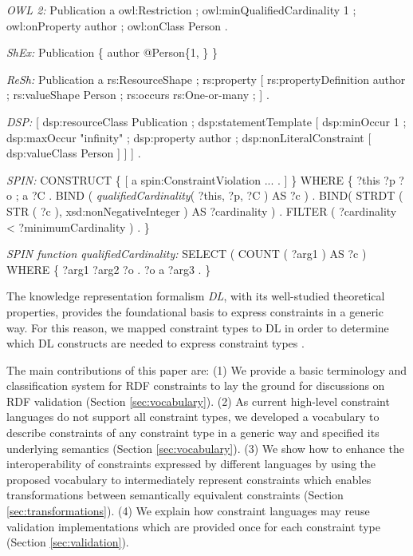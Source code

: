 \documentclass[a4paper,fontsize=11pt]{scrartcl}
\begin{document}
\begin{ex}[commandchars=\\\{\}]
\textit{OWL 2:} Publication a owl:Restriction ;
          owl:minQualifiedCardinality 1 ;
          owl:onProperty author ;
          owl:onClass Person .
		
\textit{ShEx:} Publication \{ author @Person\{1, \} \}

\textit{ReSh:} Publication a rs:ResourceShape ; rs:property [
          rs:propertyDefinition author ;
          rs:valueShape Person ;
          rs:occurs rs:One-or-many ; ] .
		
\textit{DSP:} [ dsp:resourceClass Publication ; dsp:statementTemplate [ 
          dsp:minOccur 1 ; dsp:maxOccur "infinity" ; 
          dsp:property author ; 
          dsp:nonLiteralConstraint [ dsp:valueClass Person ] ] ] .
					
\textit{SPIN:} CONSTRUCT \{ [ a spin:ConstraintViolation ... . ] \} WHERE \{ 
          ?this ?p ?o ; a ?C .
          BIND ( \textit{qualifiedCardinality}( ?this, ?p, ?C ) AS ?c ) .
          BIND( STRDT ( STR ( ?c ), xsd:nonNegativeInteger ) AS ?cardinality ) .
          FILTER ( ?cardinality < ?minimumCardinality ) . \}
						
\textit{SPIN function qualifiedCardinality:}										
SELECT ( COUNT ( ?arg1 ) AS ?c ) WHERE \{ ?arg1 ?arg2 ?o . ?o a ?arg3 . \}
\end{ex}

The knowledge representation formalism {\em DL}, with its  well-studied theoretical properties, provides the foundational basis to express constraints in a generic way. 
For this reason, we mapped constraint types to DL 
in order to determine which DL constructs are needed to express constraint types \cite{BoschNolleAcarEckert2015}.

The main contributions of this paper are:
(1) We provide a basic terminology and classification system for RDF constraints to lay the ground for discussions on RDF validation (Section \ref{sec:vocabulary}).
(2) As current high-level constraint languages do not support all constraint types, 
we developed a vocabulary to describe constraints of any constraint type in a generic way and specified its underlying semantics (Section \ref{sec:vocabulary}).
(3) We show how to enhance the interoperability of constraints expressed by different languages by using the proposed vocabulary 
to intermediately represent constraints 
which enables transformations between semantically equivalent constraints (Section \ref{sec:transformations}).
(4) We explain how constraint languages may reuse validation implementations which are provided once for each constraint type (Section \ref{sec:validation}).
\end{document}
